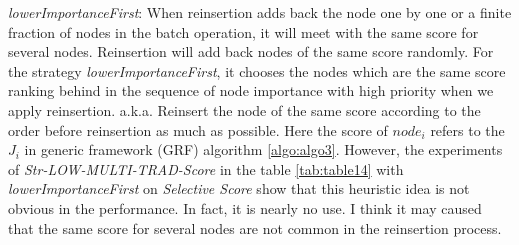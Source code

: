 \documentclass{article}
\begin{document}
\begin{enumerate}
\begin{item}
	\end{item}
		
	\begin{item}
		\textit{lowerImportanceFirst}: When reinsertion adds back the node one by one or a finite fraction of nodes in the batch operation, it will meet with the same score for several nodes. Reinsertion will add back nodes of the same score randomly. For the strategy \textit{lowerImportanceFirst}, it chooses the nodes which are the same score ranking behind in the sequence of node importance with high priority when we apply reinsertion. a.k.a. Reinsert the node of the same score according to the order before reinsertion as much as possible. Here the score of $node_i$ refers to the $J_i$ in generic framework (GRF) algorithm \ref{algo:algo3}. However, the experiments of \textit{Str-LOW-MULTI-TRAD-Score} in the table \ref{tab:table14} with \textit{lowerImportanceFirst} on \textit{Selective Score} show that this heuristic idea is not obvious in the performance. In fact, it is nearly no use. I think it may caused that the same score for several nodes are not common in the reinsertion process.
	\end{item}
	\end{enumerate}	
	
\end{document}

